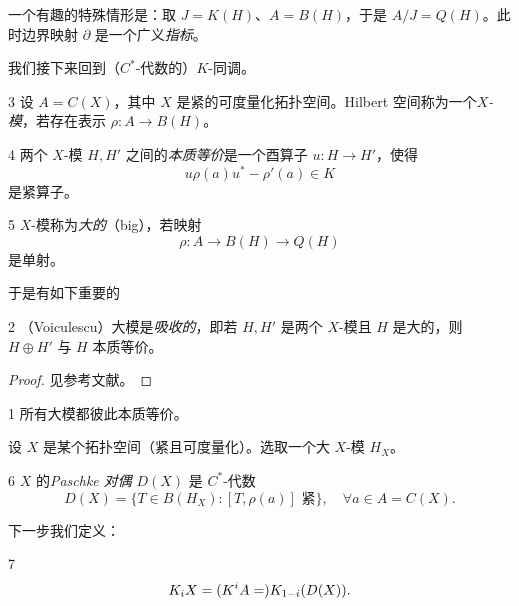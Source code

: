 一个有趣的特殊情形是：取 $J = K(H)$、$A = B(H)$，于是 $A/J = Q(H)$。此时边界映射 $\partial$ 是一个广义\emph{指标}。

我们接下来回到（$C^*$-代数的）$K$-同调。

\begin{defn}{3}
设 $A = C(X)$，其中 $X$ 是紧的可度量化拓扑空间。Hilbert 空间称为一个\emph{$X$-模}，若存在表示 $\rho : A \to B(H)$。
\end{defn}

\begin{defn}{4}
两个 $X$-模 $H, H'$ 之间的\emph{本质等价}是一个酉算子 $u : H \to H'$，使得
\[
  u\rho(a)u^* - \rho'(a) \in K
\]
是紧算子。
\end{defn}

\begin{defn}{5}
$X$-模称为\emph{大的}（big），若映射
\[
  \rho : A \to B(H) \to Q(H)
\]
是单射。
\end{defn}

于是有如下重要的

\begin{thm}{2}
（Voiculescu）大模是\emph{吸收的}，即若 $H, H'$ 是两个 $X$-模且 $H$ 是大的，则 $H \oplus H'$ 与 $H$ 本质等价。
\end{thm}

\begin{proof}
见参考文献。
\end{proof}

\begin{cor}{1}
所有大模都彼此本质等价。
\end{cor}

设 $X$ 是某个拓扑空间（紧且可度量化）。选取一个大 $X$-模 $H_X$。

\begin{defn}{6}
$X$ 的\emph{Paschke 对偶} $D(X)$ 是 $C^*$-代数
\[
  D(X) = \{T \in B(H_X) : [T,\rho(a)] \text{ 紧}\}, \quad \forall a \in A = C(X).
\]
\end{defn}

下一步我们定义：

\begin{defn}{7}
\[
   K_i X = ( K^i A =) K_{1-i}(D(X)).
\]
\end{defn}


